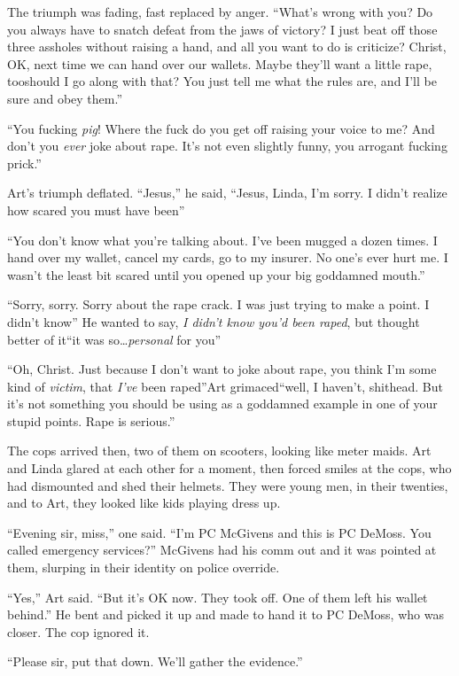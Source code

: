 The triumph was fading, fast replaced by anger. “What’s wrong with
you? Do you always have to snatch defeat from the jaws of victory?
I just beat off those three assholes without raising a hand, and
all you want to do is criticize? Christ, OK, next time we can hand
over our wallets. Maybe they’ll want a little rape, too{\dash}should I go
along with that? You just tell me what the rules are, and I’ll be
sure and obey them.”

“You fucking \emph{pig}! Where the fuck do you get off raising your
voice to me? And don’t you \emph{ever} joke about rape. It’s not
even slightly funny, you arrogant fucking prick.”

Art’s triumph deflated. “Jesus,” he said, “Jesus, Linda, I’m sorry.
I didn’t realize how scared you must have been{\dash}”

“You don’t know what you’re talking about. I’ve been mugged a dozen
times. I hand over my wallet, cancel my cards, go to my insurer. No
one’s ever hurt me. I wasn’t the least bit scared until you opened
up your big goddamned mouth.”

“Sorry, sorry. Sorry about the rape crack. I was just trying to
make a point. I didn’t know{\dash}” He wanted to say,
\emph{I didn’t know you’d been raped}, but thought better of it{\dash}“it
was so\ldots{}\emph{personal} for you{\dash}”

“Oh, Christ. Just because I don’t want to joke about rape, you
think I’m some kind of \emph{victim}, that \emph{I’ve} been
raped”{\dash}Art grimaced{\dash}“well, I haven’t, shithead. But it’s not
something you should be using as a goddamned example in one of your
stupid points. Rape is serious.”

The cops arrived then, two of them on scooters, looking like meter
maids. Art and Linda glared at each other for a moment, then forced
smiles at the cops, who had dismounted and shed their helmets. They
were young men, in their twenties, and to Art, they looked like
kids playing dress up.

“Evening sir, miss,” one said. “I’m PC McGivens and this is PC
DeMoss. You called emergency services?” McGivens had his comm out
and it was pointed at them, slurping in their identity on police
override.

“Yes,” Art said. “But it’s OK now. They took off. One of them left
his wallet behind.” He bent and picked it up and made to hand it to
PC DeMoss, who was closer. The cop ignored it.

“Please sir, put that down. We’ll gather the evidence.”

